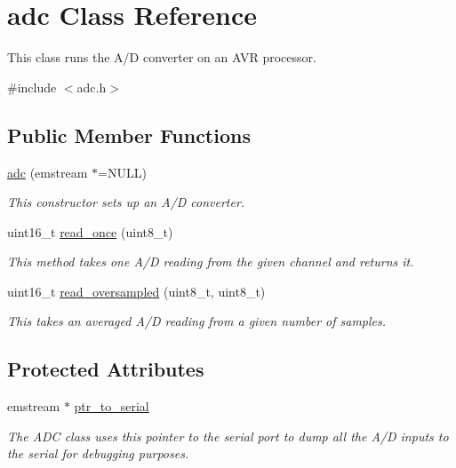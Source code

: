 \hypertarget{classadc}{}\section{adc Class Reference}
\label{classadc}


This class runs the A/D converter on an A\+VR processor.  




{\ttfamily \#include $<$adc.\+h$>$}

\subsection*{Public Member Functions}
\begin{DoxyCompactItemize}
\item 
\hyperlink{classadc_af3b8262c08f5fc5ae325a20622883424}{adc} (emstream $\ast$=N\+U\+LL)
\begin{DoxyCompactList}\small\item\em This constructor sets up an A/D converter. \end{DoxyCompactList}\item 
uint16\+\_\+t \hyperlink{classadc_a2190a59696a7093e1ea605e998ccf97e}{read\+\_\+once} (uint8\+\_\+t)
\begin{DoxyCompactList}\small\item\em This method takes one A/D reading from the given channel and returns it. \end{DoxyCompactList}\item 
uint16\+\_\+t \hyperlink{classadc_a58f1030fe64d3dea4ccd8a2687dd6fce}{read\+\_\+oversampled} (uint8\+\_\+t, uint8\+\_\+t)
\begin{DoxyCompactList}\small\item\em This takes an averaged A/D reading from a given number of samples. \end{DoxyCompactList}\end{DoxyCompactItemize}
\subsection*{Protected Attributes}
\begin{DoxyCompactItemize}
\item 
emstream $\ast$ \hyperlink{classadc_a14680b48b723bf1adddd2741ebb18a3e}{ptr\+\_\+to\+\_\+serial}\hypertarget{classadc_a14680b48b723bf1adddd2741ebb18a3e}{}\label{classadc_a14680b48b723bf1adddd2741ebb18a3e}

\begin{DoxyCompactList}\small\item\em The A\+DC class uses this pointer to the serial port to dump all the A/D inputs to the serial for debugging purposes. \end{DoxyCompactList}\end{DoxyCompactItemize}


